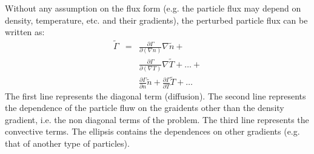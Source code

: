Without any assumption on the flux form (e.g. the particle flux may depend on density, temperature, etc. and their gradients), the perturbed particle flux can be written as:
\begin{eqnarray}
	\tilde{\Gamma} & = & \frac{\partial \Gamma}{\partial \left( \nabla n \right)}\nabla \tilde{n} + \nonumber	\\
								&		& \frac{\partial \Gamma}{\partial \left( \nabla T \right)}\nabla \tilde{T} + 
													\ldots  + \nonumber	\\
								&		& \frac{\partial \Gamma}{\partial n}\tilde{n} + \frac{\partial \Gamma}{\partial T}\tilde{T}
													+ \ldots
\end{eqnarray}
The first line represents the diagonal term (diffusion). The second line represents the dependence of the particle fluw on the graidents other than the density gradient, i.e. the non diagonal terms of the problem. The third line represents the convective terms. The ellipsis contains the dependences on other gradients (e.g. that of another type of particles).

